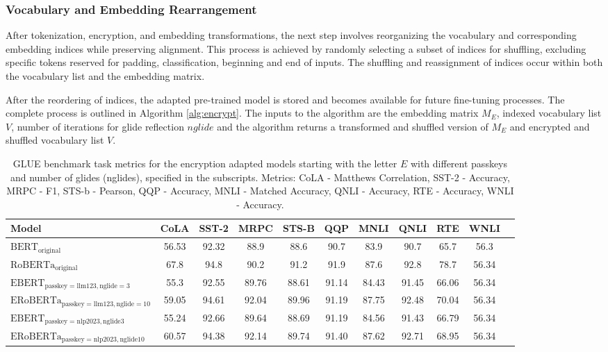 \documentclass[letterpaper]{article} %
\begin{document}
\subsubsection{Vocabulary and Embedding Rearrangement}
After tokenization, encryption, and embedding transformations, the next step involves reorganizing the vocabulary and corresponding embedding indices while preserving alignment. This process is achieved by randomly selecting a subset of indices for shuffling, excluding specific tokens reserved for padding, classification, beginning and end of inputs. The shuffling and reassignment of indices occur within both the vocabulary list and the embedding matrix.

After the reordering of indices, the adapted pre-trained model is stored and becomes available for future fine-tuning processes. The complete process is outlined in Algorithm \ref{alg:encrypt}. The inputs to the algorithm are the embedding matrix $M_E$, indexed vocabulary list $V$, number of iterations for glide reflection $nglide$ and the algorithm returns a transformed and shuffled version of $M_E$ and encrypted and shuffled vocabulary list $V$.
\begin{table}[t]
    \centering
    \footnotesize
    \begin{tabular}{lcccccccccc}
        \toprule
        \textbf{Model} & \textbf{CoLA} & \textbf{SST-2} & \textbf{MRPC} & \textbf{STS-B} & \textbf{QQP} & \textbf{MNLI} & \textbf{QNLI} & \textbf{RTE} & \textbf{WNLI} \\
        \midrule
        $\mathrm{BERT_{original}}$ & 56.53 & 92.32 & 88.9 & 88.6 & 90.7 & 83.9 & 90.7 & 65.7 & 56.3 \\
        $\mathrm{RoBERTa_{original}}$ & 67.8 & 94.8 & 90.2 & 91.2 & 91.9 & 87.6 & 92.8 & 78.7 & 56.34 \\
        $\mathrm{EBERT_{passkey=llm123, nglide=3}}$  & 55.3 & 92.55 & 89.76 & 88.61 & 91.14 & 84.43 & 91.45 & 66.06 & 56.34 \\
        $\mathrm{ERoBERTa_{passkey=llm123, nglide=10}}$  & 59.05 & 94.61 & 92.04 & 89.96 & 91.19 & 87.75 & 92.48 & 70.04 & 56.34 \\
        $\mathrm{EBERT_{passkey=nlp2023, nglide3}}$  & 55.24 & 92.66 & 89.64 & 88.69 & 91.19 & 84.56 & 91.43 & 66.79 & 56.34 \\
        $\mathrm{ERoBERTa_{passkey=nlp2023, nglide10}}$ & 60.57 & 94.38 & 92.14 & 89.74 & 91.40 & 87.62 & 92.71 & 68.95 & 56.34 \\
        \bottomrule
    \end{tabular}
    \caption{GLUE benchmark task metrics for the encryption adapted models starting with the letter $E$ with different passkeys and number of glides (nglides), specified in the subscripts. Metrics: CoLA - Matthews Correlation, SST-2 - Accuracy, MRPC - F1, STS-b - Pearson, QQP - Accuracy, MNLI - Matched Accuracy, QNLI - Accuracy, RTE - Accuracy, WNLI - Accuracy.}
    \label{tab:glueresults}
\end{table}
\end{document}
